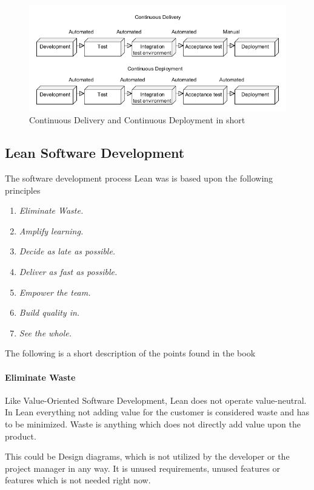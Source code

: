 \documentclass{sig-alternate}
\begin{document}
\begin{figure}
\includegraphics[scale=0.37]{Umlet/DeliveryandDeployment}
\caption{Continuous Delivery and Continuous Deployment in short}
\label{fig:deliverydeploment}
\end{figure}


\subsection{Lean Software Development}
\label{lean}
The software development process Lean \cite{poppendieck:lean} was is based upon the following principles

\begin{enumerate}
\item \textit{Eliminate Waste.}
\item \textit{Amplify learning.} 
\item \textit{Decide as late as possible.}
\item \textit{Deliver as fast as possible.}
\item \textit{Empower the team.}
\item \textit{Build quality in.} 
\item \textit{See the whole.} 
\end{enumerate}

The following is a short description of the points found in the book \cite{poppendieck:lean}

\paragraph{Eliminate Waste}
Like Value-Oriented Software Development, Lean does not operate value-neutral. 
In Lean everything not adding value for the customer is considered waste and has to be minimized.
Waste is anything which does not directly add value upon the product. 

This could be Design diagrams, which is not utilized by the developer or the project manager in any way. 
It is unused requirements, unused features or features which is not needed right now.
\end{document}
